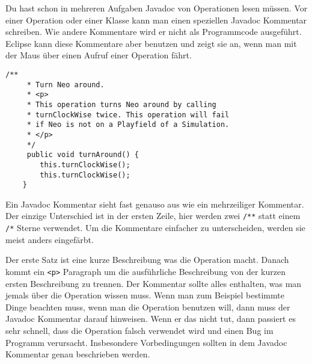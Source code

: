 \begin{Infobox}[Javadoc]
    Du hast schon in mehreren Aufgaben Javadoc von Operationen lesen müssen.
    Vor einer Operation oder einer Klasse kann man einen speziellen Javadoc Kommentar schreiben.
    Wie andere Kommentare wird er nicht als Programmcode ausgeführt.
    Eclipse kann diese Kommentare aber benutzen und zeigt sie an, wenn man mit der Maus über einen Aufruf einer Operation fährt.

    \begin{lstlisting}[numbers=none]
    /**
     * Turn Neo around.
     * <p>
     * This operation turns Neo around by calling 
     * turnClockWise twice. This operation will fail 
     * if Neo is not on a Playfield of a Simulation.
     * </p>
     */
     public void turnAround() {
        this.turnClockWise();
        this.turnClockWise();
    }
    \end{lstlisting}

    Ein Javadoc Kommentar sieht fast genauso aus wie ein mehrzeiliger Kommentar.
    Der einzige Unterschied ist in der ersten Zeile, hier werden zwei \lstinline{/**} statt einem \lstinline{/*} Sterne verwendet.
    Um die Kommentare einfacher zu unterscheiden, werden sie meist anders eingefärbt.
    
    Der erste Satz ist eine kurze Beschreibung was die Operation macht.
    Danach kommt ein \texttt{<p>} Paragraph um die ausführliche Beschreibung von der kurzen ersten Beschreibung zu trennen.
    Der Kommentar sollte alles enthalten, was man jemals über die Operation wissen muss.
    Wenn man zum Beispiel bestimmte Dinge beachten muss, wenn man die Operation benutzen will, dann muss der Javadoc Kommentar darauf hinweisen.
    Wenn er das nicht tut, dann passiert es sehr schnell, dass die Operation falsch verwendet wird und einen Bug im Programm verursacht.
    Insbesondere Vorbedingungen sollten in dem Javadoc Kommentar genau beschrieben werden.

\end{Infobox}


